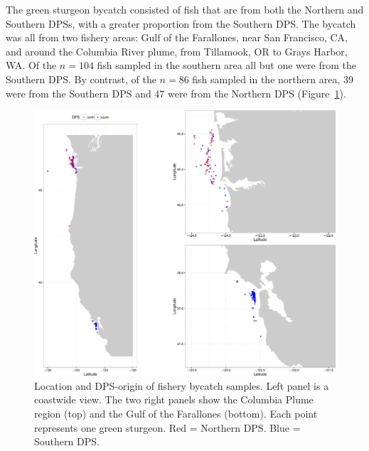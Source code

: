 The green sturgeon bycatch consisted of fish that are from both the Northern and
Southern DPSs, with a greater proportion from the Southern DPS. The bycatch was
all from two fishery areas: Gulf of the Farallones, near San Francisco, CA, and around the Columbia River
plume, from Tillamook, OR to Grays Harbor, WA. Of the $n = 104$ fish sampled in the southern
area all but one were from the Southern DPS.  By contrast, of the $n = 86$ fish sampled in the northern area,
39 were from the Southern DPS and 47 were from the Northern DPS
(Figure~\ref{fig:bycatch-map}).
\begin{figure}
\begin{center}
\includegraphics[width = \textwidth]{inputs/bycatch_map-crop.pdf}
\end{center}
\caption{ Location and DPS-origin of fishery bycatch samples. Left panel is a coastwide
view.  The two right panels show the Columbia Plume region (top) and the 
Gulf of the Farallones (bottom).  Each point represents one green sturgeon.  Red = Northern DPS. 
Blue = Southern DPS. }
\label{fig:bycatch-map}
\end{figure}




